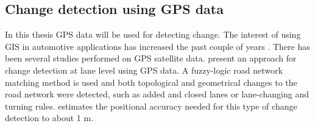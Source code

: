 








\subsection{Change detection using \ac{GPS} data}

In this thesis \ac{GPS} data will be used for detecting change. The interest of using \ac{GIS} in automotive applications has increased the past couple of years \citep{hummel}. There has been several studies performed on \ac{GPS} satellite data. \cite{yang:lanelev} present an approach for change detection at lane level using \ac{GPS} data. A fuzzy-logic road network matching method is used and both topological and geometrical changes to the road network were detected, such as added and closed lanes or lane-changing and turning rules. \cite{yang:lanelev} estimates the positional accuracy needed for this type of change detection to about 1 m. %


